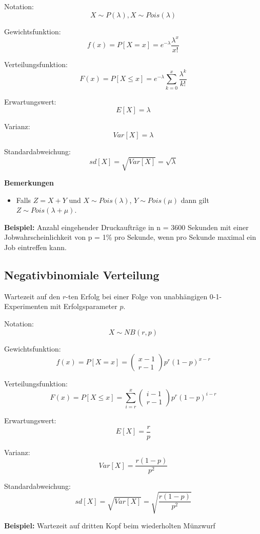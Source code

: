 \documentclass[10pt,a4paper,twocolumn]{article}
\begin{document}
\vspace{10pt}

Notation:
\[
X \sim P(\lambda), X \sim Pois(\lambda)
\]

Gewichtsfunktion:
\[
f(x)=P[X=x]=e^{-\lambda}\frac{\lambda^{x}}{x!}
\]

Verteilungsfunktion:
\[
F(x)=P[X \leq x]=e^{-\lambda}\sum \limits_{k=0}^x \frac{\lambda^{k}}{k!}
\]

Erwartungswert:
\[
E[X]=\lambda
\]

Varianz:
\[
Var[X]=\lambda
\]

Standardabweichung:
\[
sd[X]=\sqrt{Var[X]}=\sqrt{\lambda}
\]

\textbf{Bemerkungen}
\begin{itemize}
\item Falls $Z=X+Y$ und $X\sim Pois(\lambda)$, $Y\sim Pois(\mu)$ dann gilt $Z\sim Pois(\lambda+\mu)$.
\end{itemize}

\textbf{Beispiel:} Anzahl eingehender Druckaufträge in n = 3600 Sekunden mit einer Jobwahrscheinlichkeit von p = 1\% pro Sekunde, wenn pro Sekunde maximal ein Job eintreffen kann.

\subsection{Negativbinomiale Verteilung}
Wartezeit auf den $r$-ten Erfolg bei einer Folge von unabhängigen 0-1-Experimenten mit Erfolgsparameter $p$.

Notation:
\[
X \sim NB(r,p)
\]

Gewichtsfunktion:
\[
f(x)=P[X=x]=\left(
	\begin{array}{c}
		x-1 \\
		r-1
	\end{array}
\right)p^{r}(1-p)^{x-r}
\]

Verteilungsfunktion:
\[
F(x)=P[X \leq x]=\sum \limits_{i=r}^x
\left(
	\begin{array}{c}
		i-1 \\
		r-1
	\end{array}
\right)p^{r}(1-p)^{i-r}
\]

Erwartungswert:
\[
E[X]=\frac{r}{p}
\]

Varianz:
\[
Var[X]=\frac{r(1-p)}{p^2}
\]

Standardabweichung:
\[
sd[X]=\sqrt{Var[X]}=\sqrt{\frac{r(1-p)}{p^2}}
\]

\textbf{Beispiel:} Wartezeit auf dritten Kopf beim wiederholten Münzwurf
\end{document}
